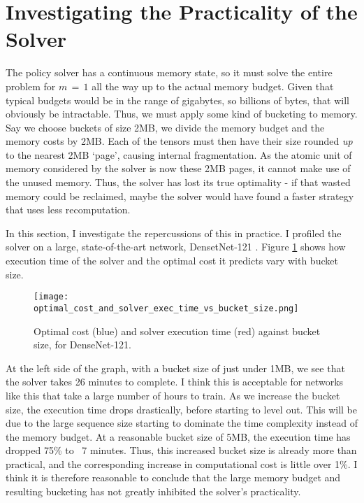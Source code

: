 \section{Investigating the Practicality of the Solver} \label{sec:4-exp-practicality}
The policy solver has a continuous memory state, so it must solve the entire problem for \(m\,=\,1\) all the way up to the actual memory budget.
Given that typical budgets would be in the range of gigabytes, so billions of bytes, that will obviously be intractable.
Thus, we must apply some kind of bucketing to memory.
Say we choose buckets of size 2MB, we divide the memory budget and the memory costs by 2MB.
Each of the tensors must then have their size rounded \textit{up} to the nearest 2MB `page', causing internal fragmentation.
As the atomic unit of memory considered by the solver is now these 2MB pages, it cannot make use of the unused memory.
Thus, the solver has lost its true optimality - if that wasted memory could be reclaimed, maybe the solver would have found a faster strategy that uses less recomputation.

In this section, I investigate the repercussions of this in practice.
I profiled the solver on a large, state-of-the-art network, DensetNet-121 \cite{Huang2017-densenet}.
Figure \ref{fig:4-bucket-size} shows how execution time of the solver and the optimal cost it predicts vary with bucket size.

\begin{figure}[h]
    \centering
    \texttt{[image: optimal\_cost\_and\_solver\_exec\_time\_vs\_bucket\_size.png]}
    \caption{Optimal cost (blue) and solver execution time (red) against bucket size, for DenseNet-121.}
    \label{fig:4-bucket-size}
\end{figure}

At the left side of the graph, with a bucket size of just under 1MB, we see that the solver takes 26 minutes to complete.
I think this is acceptable for networks like this that take a large number of hours to train.
As we increase the bucket size, the execution time drops drastically, before starting to level out.
This will be due to the large sequence size starting to dominate the time complexity instead of the memory budget.
At a reasonable bucket size of 5MB, the execution time has dropped 75\% to ~7 minutes.
Thus, this increased bucket size is already more than practical, and the corresponding increase in computational cost is little over 1\%.
I think it is therefore reasonable to conclude that the large memory budget and resulting bucketing has not greatly inhibited the solver's practicality.

